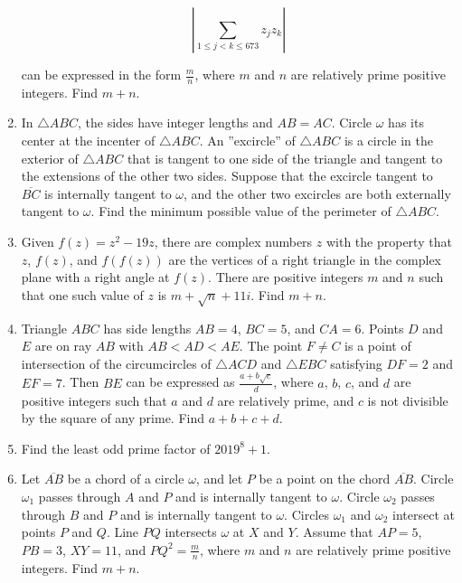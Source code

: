 \documentclass{article}
\begin{document}
\begin{enumerate}[label=\arabic*., itemsep=0.5em]
\begin{equation*}
\left| \sum_{1 \le j <k \le 673} z_jz_k \right|
\end{equation*}

can be expressed in the form $\tfrac{m}{n}$, where $m$ and $n$ are relatively prime positive integers. Find $m+n$.\par \vspace{0.5em}\item In $\triangle ABC$, the sides have integer lengths and $AB=AC$. Circle $\omega$ has its center at the incenter of $\triangle ABC$. An ''excircle'' of $\triangle ABC$ is a circle in the exterior of $\triangle ABC$ that is tangent to one side of the triangle and tangent to the extensions of the other two sides. Suppose that the excircle tangent to $\overline{BC}$ is internally tangent to $\omega$, and the other two excircles are both externally tangent to $\omega$. Find the minimum possible value of the perimeter of $\triangle ABC$.\par \vspace{0.5em}\item Given $f(z) = z^2-19z$, there are complex numbers $z$ with the property that $z$, $f(z)$, and $f(f(z))$ are the vertices of a right triangle in the complex plane with a right angle at $f(z)$. There are positive integers $m$ and $n$ such that one such value of $z$ is $m+\sqrt{n}+11i$. Find $m+n$.\par \vspace{0.5em}\item Triangle $ABC$ has side lengths $AB=4$, $BC=5$, and $CA=6$. Points $D$ and $E$ are on ray $AB$ with $AB<AD<AE$. The point $F \neq C$ is a point of intersection of the circumcircles of $\triangle ACD$ and $\triangle EBC$ satisfying $DF=2$ and $EF=7$. Then $BE$ can be expressed as $\tfrac{a+b\sqrt{c}}{d}$, where $a$, $b$, $c$, and $d$ are positive integers such that $a$ and $d$ are relatively prime, and $c$ is not divisible by the square of any prime. Find $a+b+c+d$.\par \vspace{0.5em}\item Find the least odd prime factor of $2019^8 + 1$.\par \vspace{0.5em}\item Let $\overline{AB}$ be a chord of a circle $\omega$, and let $P$ be a point on the chord $\overline{AB}$. Circle $\omega_1$ passes through $A$ and $P$ and is internally tangent to $\omega$. Circle $\omega_2$ passes through $B$ and $P$ and is internally tangent to $\omega$. Circles $\omega_1$ and $\omega_2$ intersect at points $P$ and $Q$. Line $PQ$ intersects $\omega$ at $X$ and $Y$. Assume that $AP=5$, $PB=3$, $XY=11$, and $PQ^2 = \tfrac{m}{n}$, where $m$ and $n$ are relatively prime positive integers. Find $m+n$.




\end{enumerate}
\end{document}
